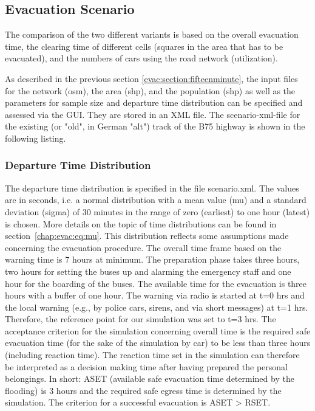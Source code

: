 \subsection{Evacuation Scenario}
The comparison of the two different variants is based on the overall evacuation time, the clearing time of different cells (squares in the area that has to be evacuated), and the numbers of cars using the road network (utilization).

As described in the previous section \ref{evac:section:fifteenminute}, the input files for the network (osm), the area (shp), and the population (shp) as well as the parameters for sample size and departure time distribution can be specified and assessed via the GUI. They are stored in an XML file. The scenario-xml-file for the existing (or "old", in German "alt") track of the B75 highway is shown in the following listing. 



\subsubsection{Departure Time Distribution}
The departure time distribution is specified in the file scenario.xml. The values are in seconds, i.e. a normal distribution with a mean value (mu) and a standard deviation (sigma) of 30 minutes in the range of zero (earliest) to one hour (latest) is chosen. 
More details on the topic of time distributions can be found in section~\ref{chap:evac:eq:mu}. This distribution reflects some assumptions made concerning the evacuation procedure. The overall time frame based on the warning time is 7 hours at minimum. The preparation phase takes three hours, two hours for setting the buses up and alarming the emergency staff and one hour for the boarding of the buses. The available time for the evacuation is three hours with a buffer of one hour. 
The warning via radio is started at t=0 hrs and the local warning (e.g., by police cars, sirens, and via short messages) at t=1 hrs. Therefore, the reference point for our simulation was set to t=3 hrs. The acceptance criterion for the simulation concerning overall time is the required safe evacuation time (for the sake of the simulation by car) to be less than three hours (including reaction time). The reaction time set in the simulation can therefore be interpreted as a decision making time after having prepared the personal belongings. In short: ASET (available safe evacuation time determined by the flooding) is 3 hours and the required safe egress time is determined by the simulation. The criterion for a successful evacuation is ASET > RSET.

